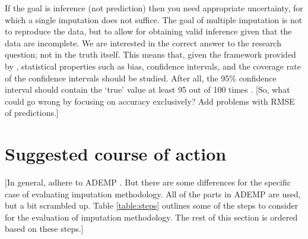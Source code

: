 \documentclass[bimj,fleqn]{w-art}
\begin{document}
If the goal is inference (not prediction) then you need appropriate uncertainty, for which a single imputation does not suffice. The goal of multiple imputation is not to reproduce the data, but to allow for obtaining valid inference given that the data are incomplete. We are interested in the correct answer to the research question; not in the truth itself. This means that, given the framework provided by \citet{rubi87}, statistical properties such as bias, confidence intervals, and the coverage rate of the confidence intervals should be studied. After all, the 95\% confidence interval should contain the `true' value at least 95 out of 100 times \citep[][p. 591]{neym34}. [So, what could go wrong by focusing on accuracy exclusively? Add problems with RMSE of predictions.]



\section{Suggested course of action}

[In general, adhere to ADEMP \citep{morr18}. But there are some differences for the specific case of evaluating imputation methodology. All of the parts in ADEMP are used, but a bit scrambled up. Table \ref{table:steps} outlines some of the steps to consider for the evaluation of imputation methodology. The rest of this section is ordered based on these steps.]
\end{document}
